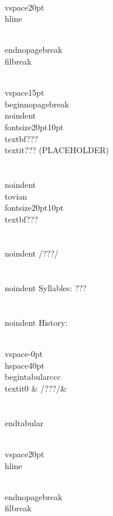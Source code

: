 \\vspace{20pt}\\hline

\\end{nopagebreak}
\\filbreak



\\vspace{15pt}
\\begin{nopagebreak}
\\noindent{\\fontsize{20pt}{10pt}\\textbf{???} } \\textit{???} (PLACEHOLDER)\\\\
\\noindent {\\tovian \\fontsize{20pt}{10pt} \\textbf{???} }\\\\
\\noindent /???/\\\\
\\noindent Syllables: ???\\\\


\\noindent History:

\\vspace{-0pt}
\\hspace{40pt}
\\begin{tabular}{ccc}
\\textit{0} & /???/& \\\\
\\end{tabular}

\\vspace{20pt}\\hline

\\end{nopagebreak}
\\filbreak



